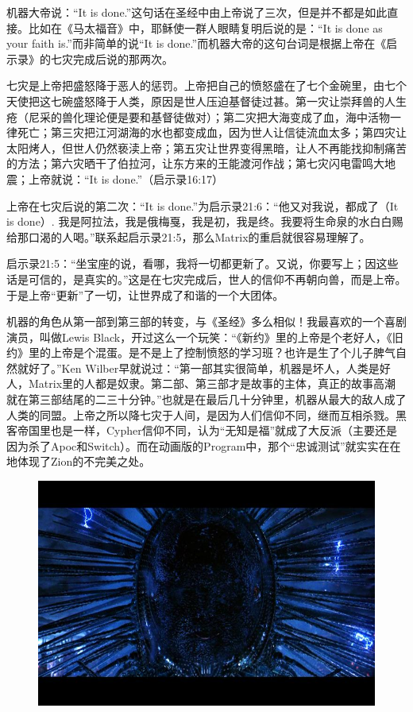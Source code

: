 \documentclass[UTF8]{ctexart}
\begin{document}
机器大帝说：“It is done.”这句话在圣经中由上帝说了三次，但是并不都是如此直接。比如在《马太福音》中，耶稣使一群人眼睛复明后说的是：“It is done as your faith is.”而非简单的说“It is done.”而机器大帝的这句台词是根据上帝在《启示录》的七灾完成后说的那两次。

七灾是上帝把盛怒降于恶人的惩罚。上帝把自己的愤怒盛在了七个金碗里，由七个天使把这七碗盛怒降于人类，原因是世人压迫基督徒过甚。第一灾让崇拜兽的人生疮（尼采的兽化理论便是要和基督徒做对）；第二灾把大海变成了血，海中活物一律死亡；第三灾把江河湖海的水也都变成血，因为世人让信徒流血太多；第四灾让太阳烤人，但世人仍然亵渎上帝；第五灾让世界变得黑暗，让人不再能找抑制痛苦的方法；第六灾晒干了伯拉河，让东方来的王能渡河作战；第七灾闪电雷鸣大地震；上帝就说：“It is done.”（启示录16:17）

上帝在七灾后说的第二次：“It is done.”为启示录21:6：“他又对我说，都成了（It is done）. 我是阿拉法，我是俄梅戛，我是初，我是终。我要将生命泉的水白白赐给那口渴的人喝。”联系起启示录21:5，那么Matrix的重启就很容易理解了。

启示录21:5：“坐宝座的说，看哪，我将一切都更新了。又说，你要写上；因这些话是可信的，是真实的。”这是在七灾完成后，世人的信仰不再朝向兽，而是上帝。于是上帝“更新”了一切，让世界成了和谐的一个大团体。

机器的角色从第一部到第三部的转变，与《圣经》多么相似！我最喜欢的一个喜剧演员，叫做Lewis Black，开过这么一个玩笑：“《新约》里的上帝是个老好人，《旧约》里的上帝是个混蛋。是不是上了控制愤怒的学习班？也许是生了个儿子脾气自然就好了。”Ken Wilber早就说过：“第一部其实很简单，机器是坏人，人类是好人，Matrix里的人都是奴隶。第二部、第三部才是故事的主体，真正的故事高潮就在第三部结尾的二三十分钟。”也就是在最后几十分钟里，机器从最大的敌人成了人类的同盟。上帝之所以降七灾于人间，是因为人们信仰不同，继而互相杀戮。黑客帝国里也是一样，Cypher信仰不同，认为“无知是福”就成了大反派（主要还是因为杀了Apoc和Switch）。而在动画版的Program中，那个“忠诚测试”就实实在在地体现了Zion的不完美之处。

\begin{figure}[htb]
\centering
\includegraphics[width=0.5\linewidth]{fig/7ea6b645b3370022cefca362.jpg}
\end{figure}
\end{document}
